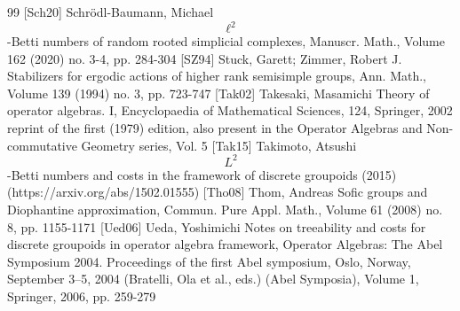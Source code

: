 \begin{thebibliography}{99}
 [Sch20] Schrödl-Baumann, Michael $$\ell ^2$$-Betti numbers of random rooted simplicial complexes, Manuscr. Math., Volume 162 (2020) no. 3-4, pp. 284-304
 [SZ94] Stuck, Garett; Zimmer, Robert J. Stabilizers for ergodic actions of higher rank semisimple groups, Ann. Math., Volume 139 (1994) no. 3, pp. 723-747
 [Tak02] Takesaki, Masamichi Theory of operator algebras. I, Encyclopaedia of Mathematical Sciences, 124, Springer, 2002 reprint of the first (1979) edition, also present in the Operator Algebras and Non-commutative Geometry series, Vol. 5
 [Tak15] Takimoto, Atsushi $${L}^2$$-Betti numbers and costs in the framework of discrete groupoids (2015) (https://arxiv.org/abs/1502.01555)
 [Tho08] Thom, Andreas Sofic groups and Diophantine approximation, Commun. Pure Appl. Math., Volume 61 (2008) no. 8, pp. 1155-1171
 [Ued06] Ueda, Yoshimichi Notes on treeability and costs for discrete groupoids in operator algebra framework, Operator Algebras: The Abel Symposium 2004. Proceedings of the first Abel symposium, Oslo, Norway, September 3–5, 2004 (Bratelli, Ola et al., eds.) (Abel Symposia), Volume 1, Springer, 2006, pp. 259-279
\end{thebibliography}
